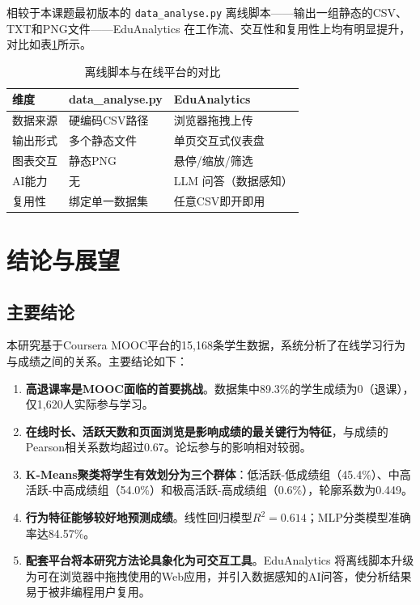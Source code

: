 \documentclass[UTF8, 12pt, a4paper]{ctexart}
\begin{document}
相较于本课题最初版本的 \texttt{data\_analyse.py} 离线脚本——输出一组静态的CSV、TXT和PNG文件——EduAnalytics 在工作流、交互性和复用性上均有明显提升，对比如表\ref{tab:cli_vs_web}所示。
\begin{table}[H]
\centering
\caption{离线脚本与在线平台的对比}
\label{tab:cli_vs_web}
\begin{tabular}{lll}
\toprule
\textbf{维度} & \textbf{data\_analyse.py} & \textbf{EduAnalytics} \\
\midrule
数据来源   & 硬编码CSV路径     & 浏览器拖拽上传 \\
输出形式   & 多个静态文件      & 单页交互式仪表盘 \\
图表交互   & 静态PNG          & 悬停/缩放/筛选 \\
AI能力     & 无               & LLM 问答（数据感知） \\
复用性     & 绑定单一数据集   & 任意CSV即开即用 \\
\bottomrule
\end{tabular}
\end{table}

\section{结论与展望}

\subsection{主要结论}

本研究基于Coursera MOOC平台的15,168条学生数据，系统分析了在线学习行为与成绩之间的关系。主要结论如下：

\begin{enumerate}
    \item \textbf{高退课率是MOOC面临的首要挑战}。数据集中89.3\%的学生成绩为0（退课），仅1,620人实际参与学习。
    \item \textbf{在线时长、活跃天数和页面浏览是影响成绩的最关键行为特征}，与成绩的Pearson相关系数均超过0.67。论坛参与的影响相对较弱。
    \item \textbf{K-Means聚类将学生有效划分为三个群体}：低活跃-低成绩组（45.4\%）、中高活跃-中高成绩组（54.0\%）和极高活跃-高成绩组（0.6\%），轮廓系数为0.449。
    \item \textbf{行为特征能够较好地预测成绩}。线性回归模型$R^2=0.614$；MLP分类模型准确率达84.57\%。
    \item \textbf{配套平台将本研究方法论具象化为可交互工具}。EduAnalytics 将离线脚本升级为可在浏览器中拖拽使用的Web应用，并引入数据感知的AI问答，使分析结果易于被非编程用户复用。
\end{enumerate}
\end{document}
